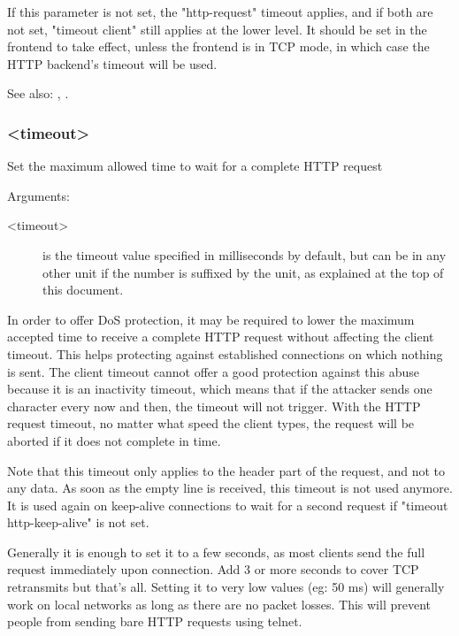 {  If this parameter is not set, the "http-request" timeout applies, and if both
  are not set, "timeout client" still applies at the lower level. It should be
  set in the frontend to take effect, unless the frontend is in TCP mode, in
  which case the HTTP backend's timeout will be used.

  See also: , .

\subsubsection[timeout http-request]{ <timeout>}

  Set the maximum allowed time to wait for a complete HTTP request


  Arguments:
  \begin{description}
  \item[<timeout>] is the timeout value specified in milliseconds by default, but
              can be in any other unit if the number is suffixed by the unit,
              as explained at the top of this document.
  \end{description}

  In order to offer DoS protection, it may be required to lower the maximum
  accepted time to receive a complete HTTP request without affecting the client
  timeout. This helps protecting against established connections on which
  nothing is sent. The client timeout cannot offer a good protection against
  this abuse because it is an inactivity timeout, which means that if the
  attacker sends one character every now and then, the timeout will not
  trigger. With the HTTP request timeout, no matter what speed the client
  types, the request will be aborted if it does not complete in time.

  Note that this timeout only applies to the header part of the request, and
  not to any data. As soon as the empty line is received, this timeout is not
  used anymore. It is used again on keep-alive connections to wait for a second
  request if "timeout http-keep-alive" is not set.

  Generally it is enough to set it to a few seconds, as most clients send the
  full request immediately upon connection. Add 3 or more seconds to cover TCP
  retransmits but that's all. Setting it to very low values (eg: 50 ms) will
  generally work on local networks as long as there are no packet losses. This
  will prevent people from sending bare HTTP requests using telnet.

}
